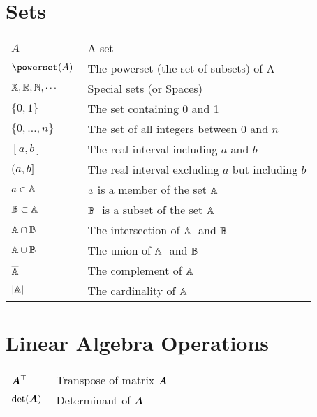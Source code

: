 \section*{Sets}
\bgroup{}
\begin{tabular}{>{\centering}p{1.2in}p{4in}}
  \(\displaystyle A~\) & A set\\
  \(\displaystyle \powerset(A)~\) & The powerset (the set of subsets) of A\\
  \(\displaystyle {\mathbb{X}}, {\mathbb{R}}, {\mathbb{N}}, \cdots~\) & Special sets (or Spaces) \\
  \(\displaystyle \{0, 1\}~\) & The set containing 0 and 1 \\
  \(\displaystyle \{0, \dots, n \}~\) & The set of all integers between  \(0\) and  \(n\) \\
  \(\displaystyle [a, b]~\) & The real interval including  \(a\) and  \(b\) \\
  \(\displaystyle (a, b]~\) & The real interval excluding  \(a\) but including  \(b\) \\
  \(\displaystyle {a} \in {\mathbb{A}}~\) &  \({a}\) is a member of the set  \({\mathbb{A}}~\) \\
  \(\displaystyle {\mathbb{B}} \subset {\mathbb{A}}~\) &  \({\mathbb{B}}~\) is a subset of the set  \({\mathbb{A}}~\) \\
  \(\displaystyle {\mathbb{A}} \cap {\mathbb{B}}~\) & The intersection of  \({\mathbb{A}}~\) and  \({\mathbb{B}}~\) \\
  \(\displaystyle {\mathbb{A}} \cup {\mathbb{B}}~\) & The union of  \({\mathbb{A}}~\) and  \({\mathbb{B}}~\) \\
  \(\displaystyle \overline{{\mathbb{A}}}~\) & The complement of  \({\mathbb{A}}~\) \\
  \(\displaystyle |{{\mathbb{A}}}|~\) & The cardinality of  \({\mathbb{A}}~\) \\

\end{tabular}

\egroup{}


\section*{Linear Algebra Operations}
\bgroup{}
\begin{tabular}{>{\centering}p{1.2in}p{4in}}
  \(\displaystyle {\bm{A}}^\top~\) & Transpose of matrix  \({\bm{A}}~\) \\
  \(\displaystyle \mathrm{\text{det}}({\bm{A}})~\) & Determinant of  \({\bm{A}}~\) \\
\end{tabular}
\egroup{}

